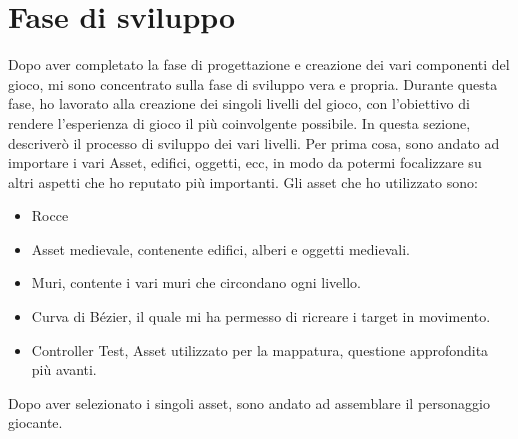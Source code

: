 \documentclass[
a4paper,
cleardoublepage=empty,
headings=twolinechapter,
numbers=autoenddot,
]{scrbook}
\begin{document}
    \section{Fase di sviluppo}
    Dopo aver completato la fase di progettazione e creazione dei vari componenti del gioco, mi sono concentrato sulla fase di sviluppo vera e propria. Durante questa fase, ho lavorato alla creazione dei singoli livelli del gioco, con l'obiettivo di rendere l'esperienza di gioco il più coinvolgente possibile. In questa sezione, descriverò il processo di sviluppo dei vari livelli.
    Per prima cosa, sono andato ad importare i vari Asset, edifici, oggetti, ecc, in modo da potermi focalizzare su altri aspetti che ho reputato più importanti.
    Gli asset che ho utilizzato sono:
    \begin{itemize}
    	\item Rocce\cite{Rock_asset}
    	\item Asset medievale\cite{Pack_asset}, contenente edifici, alberi e oggetti medievali. 
    	\item Muri\cite{Wall_asset}, contente i vari muri che circondano ogni livello.
    	\item Curva di Bézier\cite{Pack_asset}, il quale mi ha permesso di ricreare i target in movimento.
    	\item Controller Test\cite{Controller_test}, Asset utilizzato per la mappatura, questione approfondita più avanti.
    \end{itemize}
    Dopo aver selezionato i singoli asset, sono andato ad assemblare il personaggio giocante.
\end{document}
